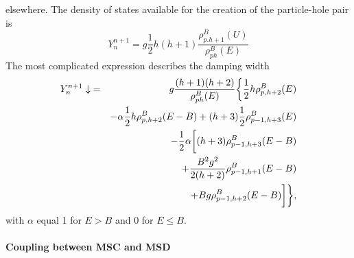elsewhere. The density of states available for the creation of the
particle-hole pair is
\begin{equation}
Y_{n}^{n+1}=g\frac{1}{2}h(h+1)\frac{\rho_{p.h+1}^{B}(U)}{\rho_{ph}^{B}(E)}
\label{Yplus}
\end{equation}
The most complicated expression describes the damping width
\begin{eqnarray}
Y_{n}^{n+1}\downarrow & = & g\frac{(h+1)(h+2)}{\rho_{ph}^{B}(E)}\biggl\{%
\frac{1}{2}h\rho_{p,h+2}^{B}(E)  \notag \\
&&-\alpha\frac{1}{2}h\rho_{p,h+2}^{B}(E-B)+(h+3)\frac{1}{2}%
\rho_{p-1,h+3}^{B}(E)  \notag \\
& & -\frac{1}{2}\alpha\biggl[(h+3)\rho_{p-1,h+3}^{B}(E-B)  \notag
\label{Ydown} \\
& & +\frac{B^{2}g^{2}}{2(h+2)}\rho_{p-1,h+1}^{B}(E-B)  \notag \\
&& +Bg\rho_{p-1,h+2}^{B}(E-B)\biggr]\biggr\},
\end{eqnarray}
\noindent with $\alpha$ equal 1 for $E>B$ and 0 for $E\leq B$.

\medskip

\paragraph{Coupling between MSC%
 and MSD%
}


